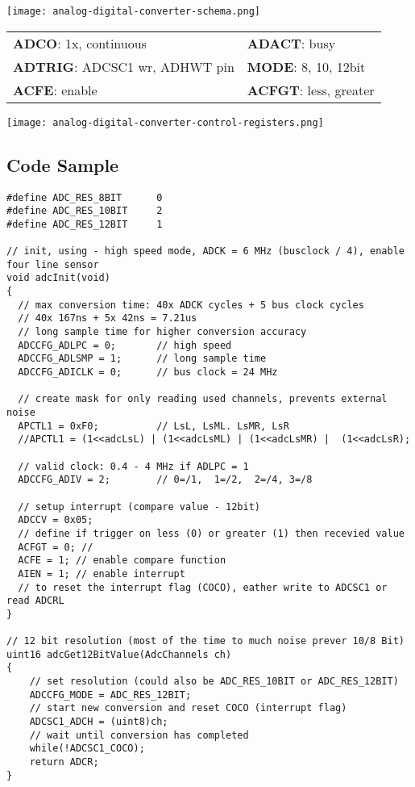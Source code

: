 \texttt{[image: analog-digital-converter-schema.png]}


\begin{tabular}{ll}
    \textbf{ADCO}: 1x, continuous         & \textbf{ADACT}: busy \\
    \textbf{ADTRIG}: ADCSC1 wr, ADHWT pin & \textbf{MODE}: 8, 10, 12bit \\
    \textbf{ACFE}: enable    & \textbf{ACFGT}: less, greater \\
\end{tabular}

\texttt{[image: analog-digital-converter-control-registers.png]}

\subsection{Code Sample}

\begin{lstlisting}
#define ADC_RES_8BIT      0
#define ADC_RES_10BIT     2
#define ADC_RES_12BIT     1

// init, using - high speed mode, ADCK = 6 MHz (busclock / 4), enable four line sensor
void adcInit(void)
{
  // max conversion time: 40x ADCK cycles + 5 bus clock cycles
  // 40x 167ns + 5x 42ns = 7.21us
  // long sample time for higher conversion accuracy
  ADCCFG_ADLPC = 0;       // high speed
  ADCCFG_ADLSMP = 1;      // long sample time
  ADCCFG_ADICLK = 0;      // bus clock = 24 MHz

  // create mask for only reading used channels, prevents external noise
  APCTL1 = 0xF0;          // LsL, LsML. LsMR, LsR
  //APCTL1 = (1<<adcLsL) | (1<<adcLsML) | (1<<adcLsMR) |  (1<<adcLsR);

  // valid clock: 0.4 - 4 MHz if ADLPC = 1
  ADCCFG_ADIV = 2;        // 0=/1,  1=/2,  2=/4, 3=/8

  // setup interrupt (compare value - 12bit)
  ADCCV = 0x05;
  // define if trigger on less (0) or greater (1) then recevied value
  ACFGT = 0; //
  ACFE = 1; // enable compare function
  AIEN = 1; // enable interrupt
  // to reset the interrupt flag (COCO), eather write to ADCSC1 or read ADCRL
}

// 12 bit resolution (most of the time to much noise prever 10/8 Bit)
uint16 adcGet12BitValue(AdcChannels ch)
{
    // set resolution (could also be ADC_RES_10BIT or ADC_RES_12BIT)
    ADCCFG_MODE = ADC_RES_12BIT;
    // start new conversion and reset COCO (interrupt flag)
    ADCSC1_ADCH = (uint8)ch;
    // wait until conversion has completed
    while(!ADCSC1_COCO);
    return ADCR;
}
\end{lstlisting}
